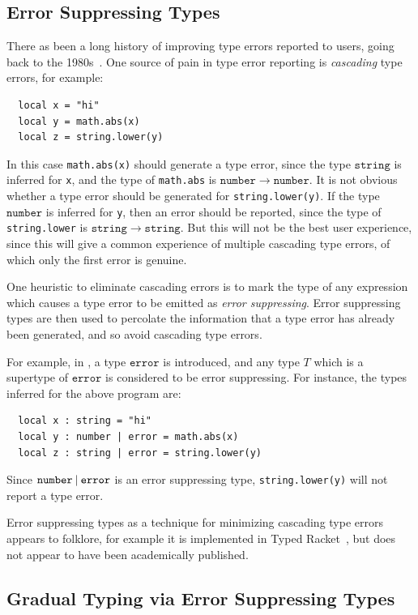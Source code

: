 \documentclass[acmsmall,review,screen]{acmart}
\newcommand{\ERROR}{\mathtt{error}}
\newcommand{\NUMBER}{\mathtt{number}}
\newcommand{\STRING}{\mathtt{string}}
\newcommand{\UNION}{\mathbin{\mathtt{\char`\|}}}
\newcommand{\fun}{\mathbin{\rightarrow}}
\begin{document}
\subsection{Error Suppressing Types}

There as been a long history of improving type errors reported to
users, going back to the
1980s~\cite{Wan86:FindingSource,JW86:MaximumFlow}.
One source of pain in type error reporting is \emph{cascading}
type errors, for example:
\begin{verbatim}
  local x = "hi"
  local y = math.abs(x)
  local z = string.lower(y)
\end{verbatim}
In this case \verb|math.abs(x)| should generate a type error, since
the type $\STRING$ is inferred for \verb|x|, and the type of
\verb|math.abs| is $\NUMBER \fun \NUMBER$.  It is not obvious whether
a type error should be generated for \verb|string.lower(y)|. If the
type $\NUMBER$ is inferred for \verb|y|, then an error should be
reported, since the type of \verb|string.lower| is $\STRING \fun \STRING$.
But this will not be the best user experience, since this will
give a common experience of multiple cascading type errors, of which only
the first error is genuine.

One heuristic to eliminate cascading errors is to mark the type of any
expression which causes a type error to be emitted as \emph{error
suppressing}. Error suppressing types are then used to percolate the
information that a type error has already been generated, and so avoid
cascading type errors.

For example, in , a type $\ERROR$ is introduced, and any
type $T$ which is a supertype of $\ERROR$ is considered to be error
suppressing. For instance, the types inferred for the above program
are:
\begin{verbatim}
  local x : string = "hi"
  local y : number | error = math.abs(x)
  local z : string | error = string.lower(y)
\end{verbatim}
Since $\NUMBER \UNION \ERROR$ is an error suppressing type,
\verb|string.lower(y)| will not report a type error.

Error suppressing types as a technique for minimizing cascading type
errors appears to folklore, for example it is implemented in Typed
Racket~\cite{TH08:ErrorHandling}, but does not appear to have been
academically published.

\subsection{Gradual Typing via Error Suppressing Types}
\end{document}
